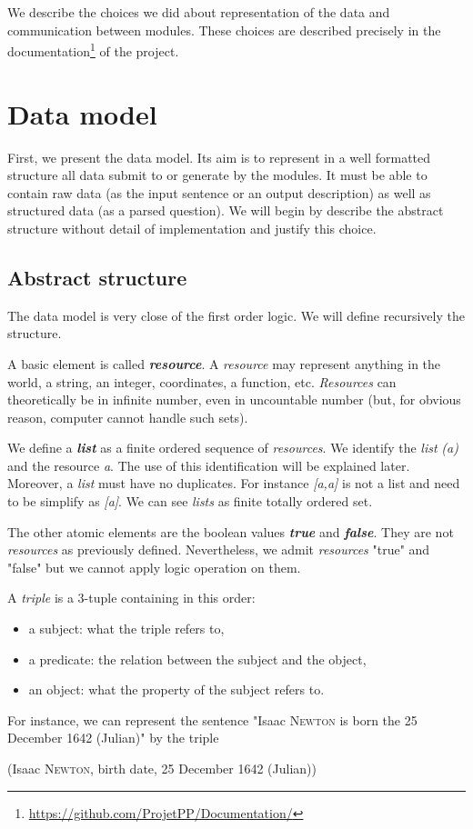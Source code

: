 We describe the choices we did about representation of the data and communication between modules.
These choices are described precisely in the documentation\footnote{\url{https://github.com/ProjetPP/Documentation/}} of the project.

\section{Data model}
\label{rdf}

First, we present the data model. Its aim is to represent in a well formatted structure all data submit to or generate by the modules. It must be able to contain raw data (as the input sentence or an output description) as well as structured data (as a parsed question). We will begin by describe the abstract structure without detail of implementation and justify this choice.

\subsection{Abstract structure}

The data model is very close of the first order logic. We will define recursively the structure.

A basic element is called \textsl{\bf resource}. A \textsl{resource} may represent anything in the world, a string, an integer, coordinates, a function, etc. \textsl{Resources} can theoretically be in infinite number, even in uncountable number (but, for obvious reason, computer cannot handle such sets).

We define a \textsl{\bf list} as a finite ordered sequence of \textsl{resources}. We identify the \textsl{list} \textsl{(a)} and the resource \textsl{a}. The use of this identification will be explained later. Moreover, a \textsl{list} must have no duplicates. For instance \textsl{[a,a]} is not a list and need to be simplify as \textsl{[a]}. We can see \textsl{lists} as finite totally ordered set.

The other atomic elements are the boolean values \textsl{\bf true} and \textsl{\bf false}. They are not \textsl{resources} as previously defined. Nevertheless, we admit \textsl{resources} "true" and "false" but we cannot apply logic operation on them.

A \textsl{triple} is a 3-tuple containing in this order:
\begin{itemize}
    \item a subject: what the triple refers to,
    \item a predicate: the relation between the subject and the object,
    \item an object: what the property of the subject refers to.
\end{itemize}
For instance, we can represent the sentence "Isaac \textsc{Newton} is born the 25 December 1642 (Julian)" by the triple \begin{center}(Isaac \textsc{Newton}, birth date, 25 December 1642 (Julian))\end{center}


